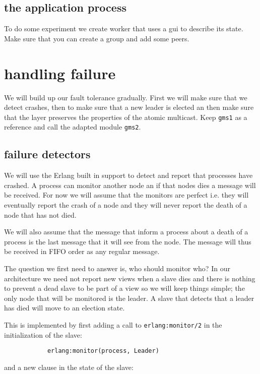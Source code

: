 \documentclass[a4paper,11pt]{article}
\begin{document}
\subsection{the application process}

To do some experiment we create worker that uses a gui to describe its
state. Make sure that you can create a group and add some peers. 


\section{handling failure}

We will build up our fault tolerance gradually. First we will make sure
that we detect crashes, then to make sure that a new leader is elected
an then make sure that the layer preserves the properties of the atomic
multicast. Keep {\tt gms1} as a reference and call the adapted module
{\tt gms2}.

\subsection{failure detectors}

We will use the Erlang built in support to detect and report that
processes have crashed. A process can monitor another node an if that
nodes dies a message will be received. For now we will assume that the
monitors are perfect i.e. they will eventually report the crash of a
node and they will never report the death of a node that has not died.

We will also assume that the message that inform a process about a
death of a process is the last message that it will see from the
node. The message will thus be received in FIFO order as any regular
message.

The question we first need to answer is, who should monitor who? In
our architecture we need not report new views when a slave dies and
there is nothing to prevent a dead slave to be part of a view so we
will keep things simple; the only node that will be monitored is the
leader. A slave that detects that a leader has died will move to an
election state. 

This is implemented by first adding a call to {\tt erlang:monitor/2}
in the initialization of the slave:

\begin{verbatim}
            erlang:monitor(process, Leader)
\end{verbatim}

and a new clause in the state of the slave:
\end{document}
